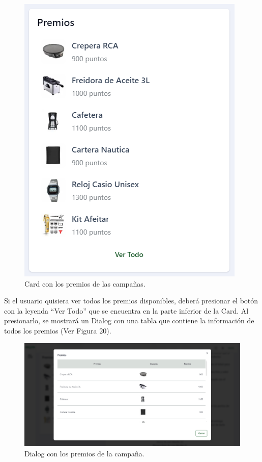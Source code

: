     \begin{figure}[H]
        \begin{center}
            \includegraphics[scale=0.60]{img/actividades/detalles-campanias/card-premios.png}
            \caption{Card con los premios de las campañas.}
            \label{fig:card-premios}
        \end{center}
    \end{figure}

Si el usuario quisiera ver todos los premios disponibles, deberá presionar el botón con la leyenda ``Ver Todo'' que se encuentra en la parte inferior de la Card. Al presionarlo, se mostrará un Dialog con una tabla que contiene la información de todos los premios (Ver Figura 20).

    \begin{figure}[H]
        \begin{center}
            \includegraphics[scale=0.33]{img/actividades/detalles-campanias/dialog-premios.png}
            \caption{Dialog con los premios de la campaña.}
            \label{fig:dialog-premios}
        \end{center}
    \end{figure}

